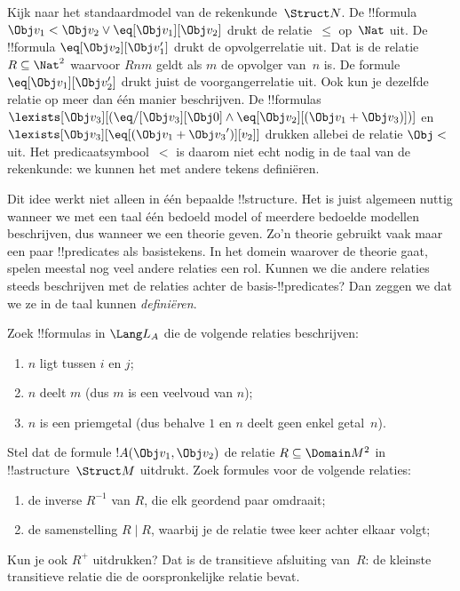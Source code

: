 \documentclass[openany]{memoir}
\begin{document}
\begin{ex}
Kijk naar het standaardmodel van de rekenkunde~$\Struct N$. De
!!{formula} $\Obj v_1 < \Obj v_2 \lor \eq[\Obj v_1][\Obj v_2]$
drukt de relatie~$\le$ op~$\Nat$ uit. De !!{formula}
$\eq[\Obj v_2][\Obj v_1']$ drukt de opvolgerrelatie uit. Dat is de
relatie $R \subseteq \Nat^2$ waarvoor $Rnm$ geldt als $m$ de opvolger
van~$n$ is. De formule $\eq[\Obj v_1][\Obj v_2']$ drukt juist de
voorgangerrelatie uit. Ook kun je dezelfde relatie op meer dan één
manier beschrijven. De !!{formula}s
$\lexists[\Obj v_3][(\eq/[\Obj v_3][\Obj 0] \land
  \eq[\Obj v_2][(\Obj v_1 + \Obj v_3)])]$ en $\lexists[\Obj
  v_3][\eq[(\Obj v_1 + {\Obj v_3}')][v_2]]$ drukken allebei de relatie
$\Obj <$ uit. Het predicaatsymbool~$<$ is daarom niet echt nodig in de
taal van de rekenkunde: we kunnen het met andere tekens definiëren.
\end{ex}

\begin{explain}
Dit idee werkt niet alleen in één bepaalde !!{structure}. Het is juist
algemeen nuttig wanneer we met een taal één bedoeld model of meerdere
bedoelde modellen beschrijven, dus wanneer we een theorie geven. Zo'n
theorie gebruikt vaak maar een paar !!{predicate}s als basistekens. In
het domein waarover de theorie gaat, spelen meestal nog veel andere
relaties een rol. Kunnen we die andere relaties steeds beschrijven met
de relaties achter de basis-!!{predicate}s? Dan zeggen we dat we ze in
de taal kunnen \emph{definiëren}.
\end{explain}

\begin{prob}
Zoek !!{formula}s in $\Lang L_A$ die de volgende relaties beschrijven:
\begin{enumerate}
\item $n$ ligt tussen $i$ en $j$;
\item $n$ deelt $m$ (dus $m$ is een veelvoud van $n$);
\item $n$ is een priemgetal (dus behalve $1$ en $n$ deelt geen enkel
  getal~$n$).
\end{enumerate}
\end{prob}

\begin{prob}
Stel dat de formule $!A(\Obj v_1, \Obj v_2)$ de relatie $R \subseteq
\Domain M^2$ in !!a{structure}~$\Struct M$ uitdrukt. Zoek formules voor
de volgende relaties:
\begin{enumerate}
\item de inverse $R^{-1}$ van $R$, die elk geordend paar omdraait;
\item de samenstelling $R \mid R$, waarbij je de relatie twee keer
  achter elkaar volgt;
\end{enumerate}
Kun je ook $R^+$ uitdrukken? Dat is de transitieve afsluiting van~$R$:
de kleinste transitieve relatie die de oorspronkelijke relatie bevat.
\end{prob}
\end{document}
